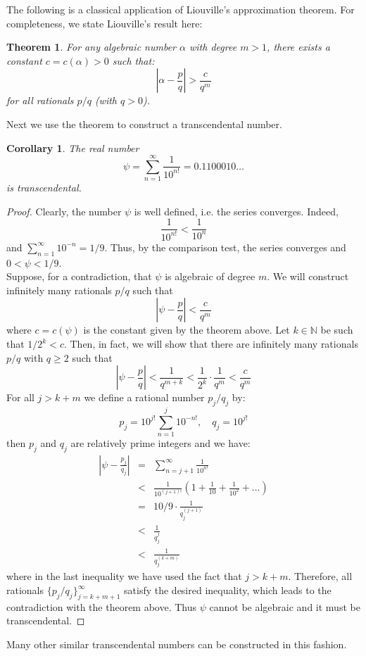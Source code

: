 \documentclass[12pt]{article}
\newtheorem{thm}{Theorem}
\newtheorem{cor}{Corollary}
\newcommand{\Nats}{\mathbb{N}}
\begin{document}
The following is a classical application of Liouville's approximation theorem. For completeness, we state Liouville's result here:

\begin{thm}
For any algebraic number $\alpha$ with degree $m>1$, there exists a constant $c=c(\alpha)>0$ such that:
$$|\alpha-\frac{p}{q}|> \frac{c}{q^m}$$
for all rationals $p/q$ (with $q>0$).
\end{thm}

Next we use the theorem to construct a transcendental number.

\begin{cor}
The real number
$$\psi= \sum_{n=1}^\infty \frac{1}{10^{n!}}=0.1100010\ldots$$
is transcendental.
\end{cor}
\begin{proof}
Clearly, the number $\psi$ is well defined, i.e. the series converges. Indeed, 
$$\frac{1}{10^{n!}}<\frac{1}{10^n}$$
and $\sum_{n=1}^\infty 10^{-n}=1/9$. Thus, by the comparison test, the series converges and $0<\psi<1/9$.\\

Suppose, for a contradiction, that $\psi$ is algebraic of degree $m$. We will construct infinitely many rationals $p/q$ such that 
$$|\psi - \frac{p}{q}|< \frac{c}{q^m}$$
where $c=c(\psi)$ is the constant given by the theorem above. Let $k\in \Nats$ be such that $1/2^k < c$. Then, in fact, we will show that there are infinitely many rationals $p/q$ with $q\geq 2$ such that 
$$|\psi -\frac{p}{q}|<\frac{1}{q^{m+k}}<\frac{1}{2^k}\cdot \frac{1}{q^m}<\frac{c}{q^m}$$
For all $j>k+m$ we define a rational number $p_j/q_j$ by:
$$p_j=10^{j!}\sum_{n=1}^j 10^{-n!},\quad q_j=10^{j!}$$
then $p_j$ and $q_j$ are relatively prime integers and we have:
\begin{eqnarray*}
|\psi - \frac{p_j}{q_j}| & = & \sum_{n=j+1}^\infty \frac{1}{10^{n!}}\\
& < & \frac{1}{10^{(j+1)!}}(1+\frac{1}{10}+\frac{1}{10^2}+\ldots)\\
& = & 10/9\cdot \frac{1}{q_j^{(j+1)}} \\
& < & \frac{1}{q_j^j}\\
& < & \frac{1}{q_j^{(k+m)}}
\end{eqnarray*}
where in the last inequality we have used the fact that $j>k+m$. Therefore, all rationals $\{ p_j/q_j \}_{j=k+m+1}^\infty$ satisfy the desired inequality, which leads to the contradiction with the theorem above. Thus $\psi$ cannot be algebraic and it must be transcendental.
\end{proof}

Many other similar transcendental numbers can be constructed in this fashion.
\end{document}
